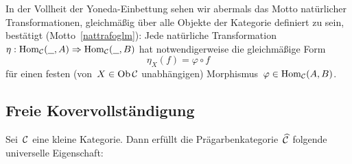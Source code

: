 \begin{bem}In der Vollheit der Yoneda-Einbettung sehen wir abermals das Motto
natürlicher Transformationen, gleichmäßig über alle Objekte der Kategorie
definiert zu sein, bestätigt (Motto~\ref{nattrafoglm}): Jede natürliche
Transformation~$\eta : \mathrm{Hom}_{\mathcal{C}}(\underline{\ \ },A) \Rightarrow \mathrm{Hom}_{\mathcal{C}}(\underline{\ \ },B)$ hat
notwendigerweise die gleichmäßige Form
\[ \eta_X(f) = \varphi \circ f \]
für einen festen (von~$X \in \operatorname{Ob}\mathcal{C}$ unabhängigen) Morphismus~$\varphi \in \mathrm{Hom}_{\mathcal{C}}(A,B)$.\end{bem}


\subsection{Freie Kovervollständigung}

Sei~$\mathcal{C}$ eine kleine Kategorie. Dann erfüllt die
Prägarbenkategorie~$\widehat{\mathcal{C}}$ folgende universelle Eigenschaft:

